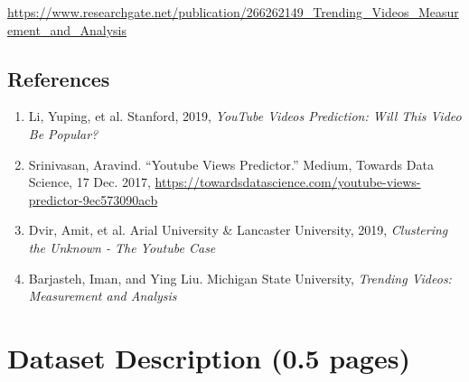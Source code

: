 \documentclass{article}
\begin{document}
\href{https://www.researchgate.net/publication/266262149_Trending_Videos_Measurement_and_Analysis}{https://www.researchgate.net/publication/266262149\_Trending\_Videos\_Measurement\_and\_Analysis} 

\subsection*{References}
\begin{enumerate}
  \item Li, Yuping, et al. Stanford, 2019, \textit{YouTube Videos Prediction: Will This Video Be Popular?} 
  \item Srinivasan, Aravind. “Youtube Views Predictor.” Medium, Towards Data Science, 17 Dec. 2017, \href{https://towardsdatascience.com/youtube-views-predictor-9ec573090acb}{https://towardsdatascience.com/youtube-views-predictor-9ec573090acb}
  \item Dvir, Amit, et al. Arial University \& Lancaster University, 2019, \textit{Clustering the Unknown - The Youtube Case}
  \item Barjasteh, Iman, and Ying Liu. Michigan State University, \textit{Trending Videos: Measurement and Analysis}
\end{enumerate}


\section*{Dataset Description (0.5 pages)}
\end{document}
